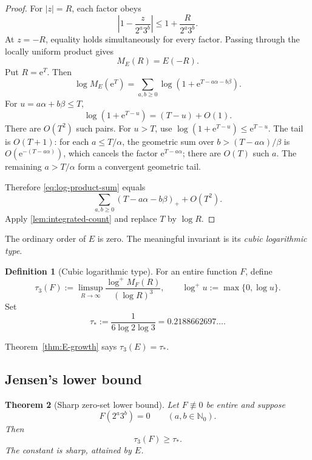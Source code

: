 \documentclass[11pt,oneside]{article}
\newtheorem{theorem}{Theorem}[section]
\theoremstyle{definition}
\newtheorem{definition}[theorem]{Definition}
\theoremstyle{remark}
\newcommand{\Nzero}{\mathbb N_0}
\newcommand{\e}{\mathrm e}
\begin{document}
\begin{proof}
For \(|z|=R\), each factor obeys
\[
  \left|1-\frac{z}{2^a3^b}\right|
  \le 1+\frac{R}{2^a3^b}.
\]
At \(z=-R\), equality holds simultaneously for every factor.  Passing through the locally uniform product gives
\[
  M_E(R)=E(-R).
\]
Put \(R=\e^T\).  Then
\begin{equation}
  \log M_E(\e^T)
  =\sum_{a,b\ge0}
  \log\left(1+\e^{T-a\alpha-b\beta}\right).
  \label{eq:log-product-sum}
\end{equation}
For \(u=a\alpha+b\beta\le T\),
\[
  \log(1+\e^{T-u})=(T-u)+O(1).
\]
There are \(O(T^2)\) such pairs.  For \(u>T\), use
\(\log(1+\e^{T-u})\le\e^{T-u}\).  The tail is \(O(T+1)\): for each
\(a\le T/\alpha\), the geometric sum over
\(b>(T-a\alpha)/\beta\) is \(O(\e^{-(T-a\alpha)})\), which cancels the factor \(\e^{T-a\alpha}\); there are \(O(T)\) such \(a\).  The remaining \(a>T/\alpha\) form a convergent geometric tail.

Therefore \eqref{eq:log-product-sum} equals
\[
  \sum_{a,b\ge0}(T-a\alpha-b\beta)_+ +O(T^2).
\]
Apply \cref{lem:integrated-count} and replace \(T\) by \(\log R\).
\end{proof}

The ordinary order of \(E\) is zero.  The meaningful invariant is its \emph{cubic logarithmic type}.

\begin{definition}[Cubic logarithmic type]
\label{def:type}
For an entire function \(F\), define
\begin{equation}
  \tau_3(F):=
  \limsup_{R\to\infty}
  \frac{\log^+ M_F(R)}{(\log R)^3},
  \qquad \log^+u:=\max\{0,\log u\}.
  \label{eq:type}
\end{equation}
Set
\begin{equation}
  \tau_*:=\frac1{6\log2\log3}
  =0.2188662697\ldots.
  \label{eq:critical-type}
\end{equation}
\end{definition}

Theorem~\ref{thm:E-growth} says \(\tau_3(E)=\tau_*\).

\subsection{Jensen's lower bound}

\begin{theorem}[Sharp zero-set lower bound]
\label{thm:jensen-lower}
Let \(F\not\equiv0\) be entire and suppose
\[
  F(2^a3^b)=0\qquad(a,b\in\Nzero).
\]
Then
\begin{equation}
  \tau_3(F)\ge\tau_*.
  \label{eq:jensen-type}
\end{equation}
The constant is sharp, attained by \(E\).
\end{theorem}
\end{document}
